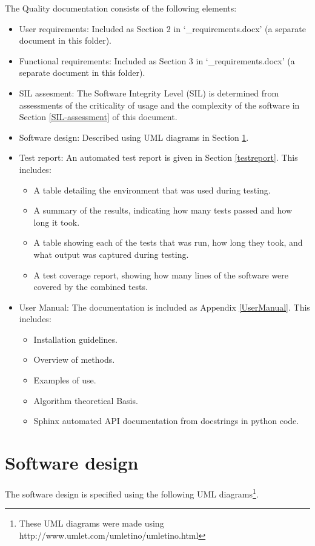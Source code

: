 \documentclass{article}
\begin{document}
The Quality documentation consists of the following elements:
\begin{itemize}
\item User requirements: Included as Section 2 in `\packagename\_requirements.docx' (a separate document in this folder).

\item Functional requirements: Included as Section 3 in `\packagename\_requirements.docx' (a separate document in this folder).

\item SIL assesment: The Software Integrity Level (SIL) is determined from assessments of the criticality of usage and the complexity of the software in Section \ref{SIL-assessment} of this document.

\item Software design: Described using UML diagrams in Section \ref{design}.

\item Test report: An automated test report is given in Section \ref{testreport}. This includes:
\begin{itemize}
\item A table detailing the environment that was used during testing.
\item A summary of the results, indicating how many tests passed and how long it took.
\item A table showing each of the tests that was run, how long they took, and what output was captured during testing.
\item A test coverage report, showing how many lines of the software were covered by the combined tests.
\end{itemize}
\item User Manual: The \packagename documentation is included as Appendix \ref{UserManual}. This includes:
\begin{itemize}
\item Installation guidelines.
\item Overview of methods.
\item Examples of use.
\item Algorithm theoretical Basis.
\item Sphinx automated API documentation from docstrings in python code.
\end{itemize}
\end{itemize}

\clearpage


\clearpage
\section{Software design}\label{design}
The software design is specified using the following UML diagrams\footnote{These UML diagrams were made using http://www.umlet.com/umletino/umletino.html}.
\end{document}

